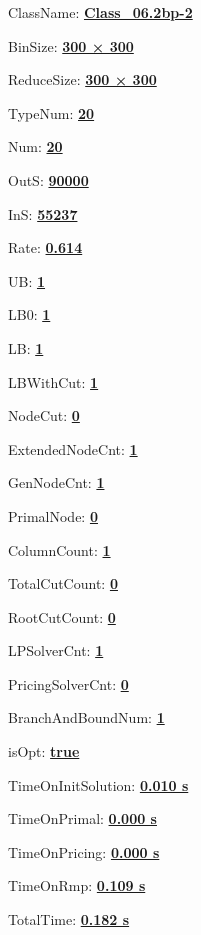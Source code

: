 \documentclass[11pt]{article}
\begin{document}
\pagestyle{empty}


ClassName: \underline{\textbf{Class_06.2bp-2}}
\par
BinSize: \underline{\textbf{300 × 300}}
\par
ReduceSize: \underline{\textbf{300 × 300}}
\par
TypeNum: \underline{\textbf{20}}
\par
Num: \underline{\textbf{20}}
\par
OutS: \underline{\textbf{90000}}
\par
InS: \underline{\textbf{55237}}
\par
Rate: \underline{\textbf{0.614}}
\par
UB: \underline{\textbf{1}}
\par
LB0: \underline{\textbf{1}}
\par
LB: \underline{\textbf{1}}
\par
LBWithCut: \underline{\textbf{1}}
\par
NodeCut: \underline{\textbf{0}}
\par
ExtendedNodeCnt: \underline{\textbf{1}}
\par
GenNodeCnt: \underline{\textbf{1}}
\par
PrimalNode: \underline{\textbf{0}}
\par
ColumnCount: \underline{\textbf{1}}
\par
TotalCutCount: \underline{\textbf{0}}
\par
RootCutCount: \underline{\textbf{0}}
\par
LPSolverCnt: \underline{\textbf{1}}
\par
PricingSolverCnt: \underline{\textbf{0}}
\par
BranchAndBoundNum: \underline{\textbf{1}}
\par
isOpt: \underline{\textbf{true}}
\par
TimeOnInitSolution: \underline{\textbf{0.010 s}}
\par
TimeOnPrimal: \underline{\textbf{0.000 s}}
\par
TimeOnPricing: \underline{\textbf{0.000 s}}
\par
TimeOnRmp: \underline{\textbf{0.109 s}}
\par
TotalTime: \underline{\textbf{0.182 s}}
\par
\newpage
\end{document}
